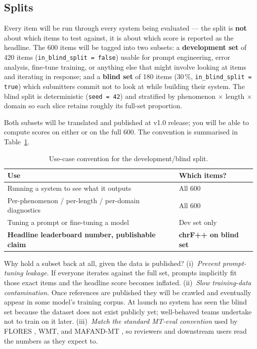 \documentclass[11pt]{article}
\begin{document}
\subsection{Splits}
\label{sec:splits}

Every item will be run through every system being evaluated --- the
split is \textbf{not} about which items to test against, it is about
which score is reported as the headline. The 600 items will be
tagged into two subsets: a \textbf{development set} of 420 items
(\texttt{in\_blind\_split = false}) usable for prompt engineering,
error analysis, fine-tune training, or anything else that might
involve looking at items and iterating in response; and a
\textbf{blind set} of 180 items (30\,\%,
\texttt{in\_blind\_split = true}) which submitters commit not to
look at while building their system. The blind split is
deterministic (\texttt{seed = 42}) and stratified by phenomenon
$\times$ length $\times$ domain so each slice retains roughly its
full-set proportion.

Both subsets will be translated and published at v1.0 release; you
will be able to compute scores on either or on the full 600. The
convention is summarised in Table~\ref{tab:split-convention}.

\begin{table}[t]
\centering
\small
\begin{tabular}{p{5cm}p{2.2cm}}
\toprule
\textbf{Use} & \textbf{Which items?} \\
\midrule
Running a system to see what it outputs & All 600 \\
Per-phenomenon / per-length / per-domain diagnostics & All 600 \\
Tuning a prompt or fine-tuning a model & Dev set only \\
\textbf{Headline leaderboard number, publishable claim} & \textbf{chrF++ on blind set} \\
\bottomrule
\end{tabular}
\caption{Use-case convention for the development/blind split.}
\label{tab:split-convention}
\end{table}

Why hold a subset back at all, given the data is published?
(i)~\emph{Prevent prompt-tuning leakage.} If everyone iterates
against the full set, prompts implicitly fit those exact items and
the headline score becomes inflated. (ii)~\emph{Slow training-data
contamination.} Once references are published they will be crawled
and eventually appear in some model's training corpus. At launch no
system has seen the blind set because the dataset does not exist
publicly yet; well-behaved teams undertake not to train on it
later. (iii)~\emph{Match the standard MT-eval convention} used by
FLORES \citep{goyal2022flores}, WMT, and MAFAND-MT
\citep{adelani2022mafand}, so reviewers and downstream users read
the numbers as they expect to.
\end{document}
